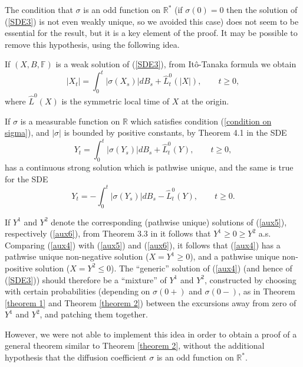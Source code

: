 \documentclass[reqno]{amsart}
\theoremstyle{definition}
\theoremstyle{remark}
\numberwithin{equation}{section}
\begin{document}
The condition that $\sigma $ is an odd function on $\mathbb{R}^{\ast }$ (if $\sigma \left( 0\right) =0$ then the solution of (\ref{SDE3}) is not even
weakly unique, so we avoided this case) does not seem to be essential for
the result, but it is a key element of the proof. It may be possible to
remove this hypothesis, using the following idea.

If $(X,B,\mathbb{F})$ is a weak solution of (\ref{SDE3}), from It\^{o}-Tanaka formula we obtain\begin{equation}\label{aux4}
\left\vert X_{t}\right\vert =\int_{0}^{t}\left\vert \sigma \left(
X_{s}\right) \right\vert dB_{s}+\widehat{L}_{t}^{0}\left( \vert X\vert \right) ,\qquad t\geq 0,
\end{equation}
where $\widehat{L}^0(X)$ is the symmetric local time of $X$ at the origin.

If $\sigma$ is a measurable function on $\mathbb{R}$ which satisfies condition (\ref{condition on sigma}), and $\vert\sigma\vert$ is bounded by positive constants, by Theorem 4.1 in \cite{Bass-Chen} the SDE
\begin{equation}\label{aux5}
Y_{t} =\int_{0}^{t}\left\vert \sigma \left(
Y_{s}\right) \right\vert dB_{s}+\widehat{L}_{t}^{0}\left( Y \right) ,\qquad t\geq 0,
\end{equation}
has a continuous strong solution which is pathwise unique, and the same is true for the SDE
\begin{equation}\label{aux6}
Y_{t} =-\int_{0}^{t}\left\vert \sigma \left(
Y_{s}\right) \right\vert dB_{s}-\widehat{L}_{t}^{0}\left( Y \right) ,\qquad t\geq 0.
\end{equation}

If $Y^1$ and $Y^2$ denote the corresponding (pathwise unique) solutions of (\ref{aux5}), respectively (\ref{aux6}), from Theorem 3.3 in \cite{Bass-Chen} it follows that $Y^1\ge 0\ge Y^2$ a.s. Comparing (\ref{aux4}) with (\ref{aux5}) and (\ref{aux6}), it follows that (\ref{aux4}) has a pathwise unique non-negative solution ($X=Y^1\ge0$), and a
pathwise unique non-positive solution ($X=Y^{2}\le0$). The ``generic'' solution of (\ref{aux4}) (and hence of (\ref{SDE3})) should therefore be a ``mixture'' of $Y^1$ and $Y^2$, constructed by choosing with certain probabilities (depending on $\sigma(0+)$ and $\sigma(0-)$, as in Theorem \ref{theorem 1} and Theorem \ref{theorem 2}) between the excursions away from zero of $Y^1$ and $Y^2$, and patching them together.


However, we were not able to implement this idea in order to obtain a proof of a general theorem similar to Theorem \ref{theorem 2}, without the additional hypothesis that the diffusion coefficient $\sigma $ is an odd function on $\mathbb{R}^{\ast }$.
\vspace{1.2cm}
\end{document}
